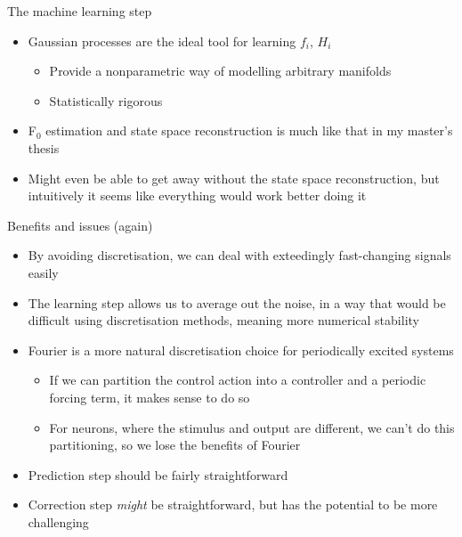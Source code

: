 \documentclass[presentation]{beamer}
\begin{document}
\begin{frame}[label={sec:org93ebe57}]{The machine learning step}
\begin{itemize}
\item Gaussian processes are the ideal tool for learning \(f_i\), \(H_i\)
\begin{itemize}
\item Provide a nonparametric way of modelling arbitrary manifolds
\item Statistically rigorous
\end{itemize}
\item F\(_{\text{0}}\) estimation and state space reconstruction is much like that in my master's thesis
\item Might even be able to get away without the state space reconstruction, but intuitively it seems like everything would work better doing it
\end{itemize}
\end{frame}

\begin{frame}[label={sec:org555351f}]{Benefits and issues (again)}
\begin{itemize}
\item By avoiding discretisation, we can deal with exteedingly fast-changing signals easily
\item The learning step allows us to average out the noise, in a way that would be difficult using discretisation methods, meaning more numerical stability
\item Fourier is a more natural discretisation choice for periodically excited systems
\begin{itemize}
\item If we can partition the control action into a controller and a periodic forcing term, it makes sense to do so
\item For neurons, where the stimulus and output are different, we can't do this partitioning, so we lose the benefits of Fourier
\end{itemize}
\item Prediction step should be fairly straightforward
\item Correction step \emph{might} be straightforward, but has the potential to be more challenging
\end{itemize}
\end{frame}
\end{document}
